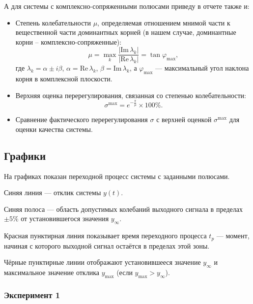 \documentclass[a4paper,12pt]{article}
\begin{document}
	\vspace{0.5em}
	
	А для системы с комплексно-сопряженными полюсами приведу в отчете также и:
	
	\begin{itemize}
		\item Степень колебательности \(\mu\), определяемая отношением мнимой части к вещественной части доминантных корней (в нашем случае, доминантные корни -- комплексно-сопряженные):
		\[
		\mu = \max_k \frac{|\mathrm{Im}\, \lambda_k|}{|\mathrm{Re}\, \lambda_k|} = \tan \varphi_{\max},
		\]
		где \(\lambda_k = \alpha \pm i \beta\), \(\alpha = \mathrm{Re}\, \lambda_k\), \(\beta = \mathrm{Im}\, \lambda_k\), а \(\varphi_{\max}\) — максимальный угол наклона корня в комплексной плоскости.
		
		\item Верхняя оценка перерегулирования, связанная со степенью колебательности:
		\[
		\sigma^{\max} = e^{-\frac{\pi}{\mu}} \times 100\%.
		\]
		
		\item Сравнение фактического перерегулирования \(\sigma\) с верхней оценкой \(\sigma^{\max}\) для оценки качества системы.
	\end{itemize}


	
	\subsection{Графики}
	
	На графиках показан переходной процесс системы с заданными полюсами.
	
	Синяя линия — отклик системы $y(t)$.
	
	Синяя полоса — область допустимых колебаний выходного сигнала в пределах $\pm 5\%$ от установившегося значения $y_\infty$.
	
	Красная пунктирная линия показывает время переходного процесса $t_p$ — момент, начиная с которого выходной сигнал остаётся в пределах этой зоны.
	
	Чёрные пунктирные линии отображают установившееся значение $y_\infty$ и максимальное значение отклика $y_{\max}$ (если $y_{\max} > y_\infty$).

	
	
	\subsubsection{Эксперимент 1}
	
\end{document}

